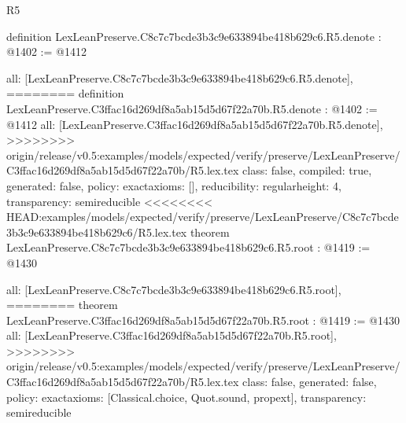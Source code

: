 \begin{lexlean}{R5}
\begin{coremodule}
{{{{{{{{{{{definition LexLeanPreserve.C8c7c7bcde3b3c9e633894be418b629c6.R5.denote : @1402 := @1412 {
  all: [LexLeanPreserve.C8c7c7bcde3b3c9e633894be418b629c6.R5.denote],
========
definition LexLeanPreserve.C3ffac16d269df8a5ab15d5d67f22a70b.R5.denote : @1402 := @1412 {
  all: [LexLeanPreserve.C3ffac16d269df8a5ab15d5d67f22a70b.R5.denote],
>>>>>>>> origin/release/v0.5:examples/models/expected/verify/preserve/LexLeanPreserve/C3ffac16d269df8a5ab15d5d67f22a70b/R5.lex.tex
  class: false,
  compiled: true,
  generated: false,
  policy: exact{axioms: []},
  reducibility: regular{height: 4},
  transparency: semireducible
}
<<<<<<<< HEAD:examples/models/expected/verify/preserve/LexLeanPreserve/C8c7c7bcde3b3c9e633894be418b629c6/R5.lex.tex
theorem LexLeanPreserve.C8c7c7bcde3b3c9e633894be418b629c6.R5.root : @1419 := @1430 {
  all: [LexLeanPreserve.C8c7c7bcde3b3c9e633894be418b629c6.R5.root],
========
theorem LexLeanPreserve.C3ffac16d269df8a5ab15d5d67f22a70b.R5.root : @1419 := @1430 {
  all: [LexLeanPreserve.C3ffac16d269df8a5ab15d5d67f22a70b.R5.root],
>>>>>>>> origin/release/v0.5:examples/models/expected/verify/preserve/LexLeanPreserve/C3ffac16d269df8a5ab15d5d67f22a70b/R5.lex.tex
  class: false,
  generated: false,
  policy: exact{axioms: [Classical.choice, Quot.sound, propext]},
  transparency: semireducible
}

}}}}}}}}}}}}}
\end{coremodule}
\end{lexlean}
